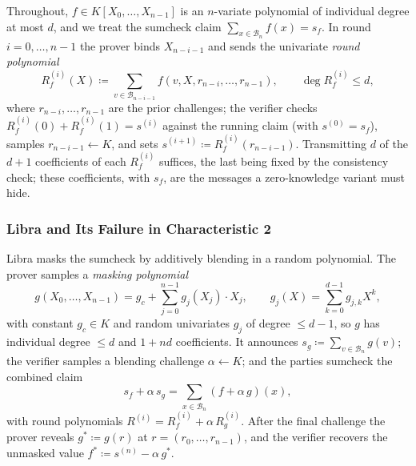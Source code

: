 \documentclass{article}
\theoremstyle{definition}
\newcommand{\BB}{\mathcal{B}}
\begin{document}
Throughout, $f \in K[X_0, \ldots, X_{n - 1}]$ is an $n$-variate polynomial of individual degree at most $d$, and we treat the sumcheck claim $\sum_{x \in \BB_n} f(x) = s_f$. In round $i = 0, \ldots, n - 1$ the prover binds $X_{n - i - 1}$ and sends the univariate \emph{round polynomial}
\[
  R_f^{(i)}(X) \coloneqq \sum_{v \in \BB_{n - i - 1}} f(v, X, r_{n - i}, \ldots, r_{n - 1}), \qquad \deg R_f^{(i)} \le d,
\]
where $r_{n - i}, \ldots, r_{n - 1}$ are the prior challenges; the verifier checks $R_f^{(i)}(0) + R_f^{(i)}(1) = s^{(i)}$ against the running claim (with $s^{(0)} = s_f$), samples $r_{n - i - 1} \gets K$, and sets $s^{(i + 1)} \coloneqq R_f^{(i)}(r_{n - i - 1})$. Transmitting $d$ of the $d + 1$ coefficients of each $R_f^{(i)}$ suffices, the last being fixed by the consistency check; these coefficients, with $s_f$, are the messages a zero-knowledge variant must hide.

\subsubsection{Libra and Its Failure in Characteristic 2}
\label{sec:libra}

Libra masks the sumcheck by additively blending in a random polynomial. The prover samples a \emph{masking polynomial}
\[
  g(X_0, \ldots, X_{n - 1}) = g_c + \sum_{j = 0}^{n - 1} g_j(X_j) \cdot X_j, \qquad g_j(X) = \sum_{k = 0}^{d - 1} g_{j, k} X^k,
\]
with constant $g_c \in K$ and random univariates $g_j$ of degree $\le d - 1$, so $g$ has individual degree $\le d$ and $1 + nd$ coefficients. It announces $s_g \coloneqq \sum_{v \in \BB_n} g(v)$; the verifier samples a blending challenge $\alpha \gets K$; and the parties sumcheck the combined claim
\[
  s_f + \alpha\, s_g = \sum_{x \in \BB_n} (f + \alpha\, g)(x),
\]
with round polynomials $R^{(i)} = R_f^{(i)} + \alpha\, R_g^{(i)}$. After the final challenge the prover reveals $g^* \coloneqq g(r)$ at $r = (r_0, \ldots, r_{n - 1})$, and the verifier recovers the unmasked value $f^* \coloneqq s^{(n)} - \alpha\, g^*$.
\end{document}
